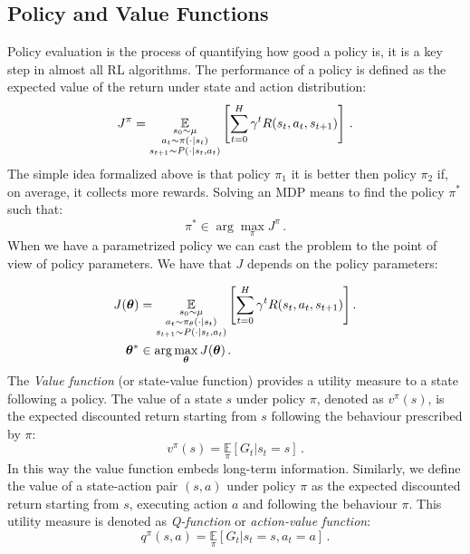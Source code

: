 \subsection{Policy and Value Functions}
Policy evaluation is the process of quantifying how good a policy is, it is a key step in almost all RL algorithms. The performance of a policy is defined as the expected value of the return under state and action distribution:
\begin{equation}
J^\pi = \underset{\begin{subarray}{c}
	s_0 \sim \mu \\
	a_t \sim \pi(\cdot | s_t) \\
	s_{t+1} \sim P(\cdot | s_t, a_t)
\end{subarray}
}{\mathbb{E}}\left[ \sum_{t=0}^H \gamma^t R(s_t,a_t, s_{t+1})\right] \, .
\end{equation}
The simple idea formalized above is that policy $\pi_1$ it is better then policy $\pi_2$ if, on average, it collects more rewards. 
Solving an MDP means to find the policy $\pi^*$ such that:
\begin{equation}
\pi^* \in \arg \max_{\pi} J^{\pi} \, .
\label{argmaxJ}
\end{equation}
When we have a parametrized policy we can cast the problem to the point of view of policy parameters. We have that $J$ depends on the policy parameters:
 
\begin{align}
J(\boldsymbol{\theta}) &= \underset{
\begin{subarray}{c}
s_0 \sim \mu \\
	a_t \sim \pi_\theta(\cdot | s_t) \\
	s_{t+1} \sim P(\cdot | s_t, a_t)
\end{subarray}
}{\mathbb{E}}\left[ \sum_{t=0}^H \gamma^{t} R(s_t, a_t, s_{t+1}) \right] . \\
\boldsymbol{\theta}^* & \in \arg \max_{\boldsymbol{\theta}} J(\boldsymbol{\theta}) \, .
\end{align}
The \textit{Value function} (or state-value function) provides a utility measure to a state following a policy. The value of a state $s$ under policy $\pi$, denoted as $v^\pi(s)$, is the expected  discounted return starting from $s$ following the behaviour prescribed by $\pi$:
\begin{equation}
v^\pi(s) = \underset{\pi}{\mathbb{E}} \left[ G_t | s_t = s \right] \, .
\end{equation}
In this way the value function embeds long-term information.
Similarly, we define the value of a state-action pair $(s,a)$ under policy $\pi$ as the expected discounted return starting from $s$, executing action $a$ and following the behaviour $\pi$. This utility measure is denoted as \textit{Q-function} or \textit{action-value function}:
 \begin{equation}
q^\pi(s,a) = \underset{\pi}{\mathbb{E}} \left[ G_t | s_t = s, a_t = a \right] \, .
\end{equation}
 
